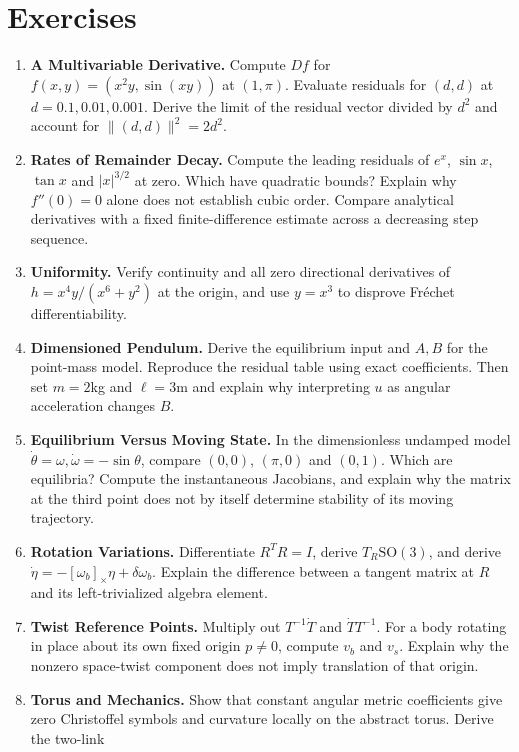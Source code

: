\section{Exercises}

\begin{enumerate}[itemsep=3pt,topsep=4pt]
\item \textbf{A Multivariable Derivative.} Compute $Df$ for $f(x,y)=(x^2y,\sin(xy))$
at $(1,\pi)$. Evaluate residuals for $(d,d)$ at $d=0.1,0.01,0.001$. Derive the limit
of the residual vector divided by $d^2$ and account for $\|(d,d)\|^2=2d^2$.
\item \textbf{Rates of Remainder Decay.} Compute the leading residuals of $e^x$, $\sin x$,
$\tan x$ and $|x|^{3/2}$ at zero. Which have quadratic bounds? Explain why $f''(0)=0$
alone does not establish cubic order. Compare analytical derivatives with a fixed
finite-difference estimate across a decreasing step sequence.
\item \textbf{Uniformity.} Verify continuity and all zero directional derivatives of
$h=x^4y/(x^6+y^2)$ at the origin, and use $y=x^3$ to disprove Fréchet differentiability.
\item \textbf{Dimensioned Pendulum.} Derive the equilibrium input and $A,B$ for the
point-mass model. Reproduce the residual table using exact coefficients. Then set
$m=2$kg and $\ell=3$m and explain why interpreting $u$ as angular acceleration changes $B$.
\item \textbf{Equilibrium Versus Moving State.} In the dimensionless undamped model
$\dot\theta=\omega,\dot\omega=-\sin\theta$, compare $(0,0)$, $(\pi,0)$ and $(0,1)$.
Which are equilibria? Compute the instantaneous Jacobians, and explain why the matrix at
the third point does not by itself determine stability of its moving trajectory.
\item \textbf{Rotation Variations.} Differentiate $R^TR=I$, derive $T_R\mathrm{SO}(3)$,
and derive $\dot\eta=-[\omega_b]_\times\eta+\delta\omega_b$. Explain the difference
between a tangent matrix at $R$ and its left-trivialized algebra element.
\item \textbf{Twist Reference Points.} Multiply out $T^{-1}\dot T$ and $\dot TT^{-1}$.
For a body rotating in place about its own fixed origin $p\ne0$, compute $v_b$ and $v_s$.
Explain why the nonzero space-twist component does not imply translation of that origin.
\item \textbf{Torus and Mechanics.} Show that constant angular metric coefficients give
zero Christoffel symbols and curvature locally on the abstract torus. Derive the two-link

\end{enumerate}
